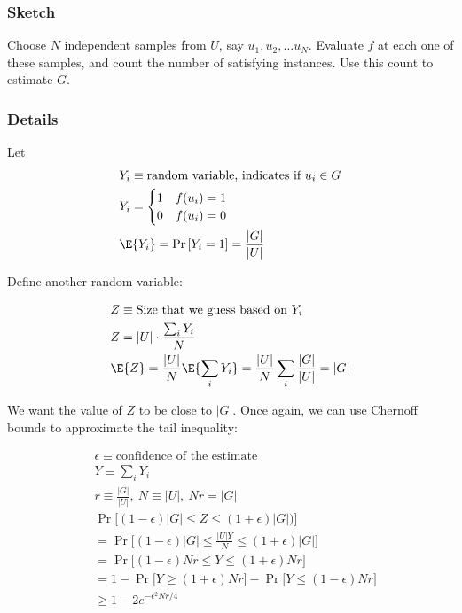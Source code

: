 \subsubsection{Sketch}
Choose $N$ independent samples from $U$, say $u_1, u_2, \dots u_N$. Evaluate
$f$ at each one of these samples, and count the number of satisfying instances.
Use this count to estimate $G$.

\subsubsection{Details}

Let 
\begin{align*}
    &Y_i \equiv \text{random variable, indicates if $u_i \in G$} \\
    &Y_i = \begin{cases}
        1 & f(u_i) = 1 \\
        0 & f(u_i) = 0
    \end{cases} \\
    &\E{Y_i} = \Pr{[Y_i = 1]} = \frac{|G|}{|U|} \\
\end{align*}

Define another random variable:

\begin{align*}
    &Z \equiv \text{Size that we guess based on $Y_i$} \\
    &Z = |U| \cdot \frac{\sum_i Y_i}{N} \\
    &\E{Z} = \frac{|U|}{N}\E{\sum_i Y_i} =  \frac{|U|}{N} \sum_i \frac{|G|}{|U|} = |G|
\end{align*}

We want the value of $Z$ to be close to $|G|$. Once again, we can use Chernoff
bounds to approximate the tail inequality:

\begin{align*}
    &\epsilon \equiv \text{confidence of the estimate} \\
    & Y \equiv \sum_i Y_i \\
    & r \equiv \frac{|G|}{|U|},~ N \equiv |U|,~ Nr = |G| \\
    &\Pr \big[ (1 - \epsilon)|G| \leq Z \leq (1 + \epsilon)|G|) \big] \\
    &=\Pr \big[ (1 - \epsilon)|G| \leq \frac{|U|Y}{N} \leq (1 + \epsilon)|G| \big] \\
    &=\Pr \big[ (1 - \epsilon)Nr \leq  Y \leq (1 + \epsilon)Nr \big] \\
    &= 1 - \Pr \big[  Y \geq (1 + \epsilon)Nr \big] - \Pr \big[ Y \leq (1 - \epsilon)Nr \big]\\
    &\geq 1 - 2e^{-\epsilon^2 Nr / 4}
\end{align*}

